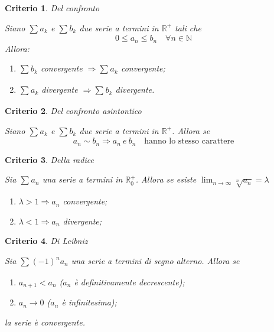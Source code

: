 \documentclass[a4paper, titlepage]{report}%
\theoremstyle{definition} %
\theoremstyle{plain}
\theoremstyle{plain}
\theoremstyle{remark}
\theoremstyle{remark}
\theoremstyle{plain}
\newtheorem*{criterio}{Criterio}
\theoremstyle{plain}
\theoremstyle{plain}
\theoremstyle{plain}
\theoremstyle{plain}
\begin{document}
\begin{criterio}{Del confronto}

    Siano $\sum_{}^{}a_k $ e $\sum_{}^{}b_k $ due serie a termini
    in $\mathbb{R^+}$ tali che
\[
    0 \leq a_n \leq b_n \quad \forall n \in \mathbb{N}    
\]
Allora:
       \begin{enumerate}
    \item $\sum_{}^{}b_k$ convergente $\Longrightarrow \sum_{}^{}a_k $ 
         convergente;
    \item $\sum_{}^{}a_k$ divergente $\Longrightarrow \sum_{}^{}b_k $ 
    divergente.
    
       \end{enumerate} 
\end{criterio}
\begin{criterio}{Del confronto asintontico}

    Siano $\sum_{}^{}a_k $ e $\sum_{}^{}b_k $ due serie a termini
    in $\mathbb{R^+}$. Allora se
\[
      a_n \sim b_n \Longrightarrow a_n \ e \  b_n \quad 
       \text{hanno lo stesso carattere}  
\]
\end{criterio}
\begin{criterio}{Della radice}

    Sia $\sum_{}^{}a_n$ una serie a termini in $\mathbb{R}_0^+$. Allora se esiste
     $\lim_{n \to \infty} \sqrt[n]{a_n} = \lambda$
   \begin{enumerate}
    \item $\lambda > 1 \Longrightarrow a_n $ convergente;
    \item $\lambda < 1 \Longrightarrow a_n $ divergente;
   \end{enumerate}

\end{criterio}
\begin{criterio}{Di Leibniz}

    Sia $\sum_{}^{}(-1)^na_n$ una serie a termini di segno alterno. Allora se
  \begin{enumerate}
    \item $a_{n+1}<a_n$ ($a_n $ è definitivamente decrescente);
    \item $a_n \rightarrow 0$ ($a_n$ è infinitesima);
  \end{enumerate}
    
  la serie è convergente.
\end{criterio}
\end{document}
